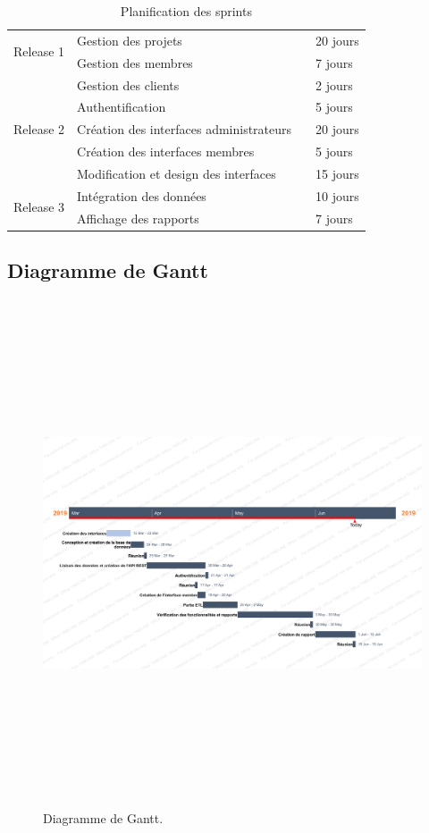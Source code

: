 \FloatBarrier
\begin{table}

\begin{tabular}{|l|l|l|}
\hline
\multirow{2}{*}{Release 1} & Gestion des projets                        & 20 jours  \\
\cline{2-3}
                           & Gestion des membres                        & 7 jours   \\
\hline
\multirow{5}{*}{Release 2} & Gestion des clients                        & 2 jours   \\
\cline{2-3}
                           & Authentification                           & 5 jours   \\
\cline{2-3}
                           & Création des interfaces administrateurs    & 20 jours  \\
\cline{2-3}
                           & Création des interfaces membres            & 5 jours   \\
\cline{2-3}
                           & Modification et design des interfaces~ ~ ~ & 15 jours  \\
\hline
\multirow{2}{*}{Release 3} & Intégration des données                    & 10 jours  \\
\cline{2-3}
                           & Affichage des rapports                     & 7 jours   \\
\hline

\end{tabular}
\centering
\caption{Planification des sprints }
\end{table}
\FloatBarrier


\subsection{Diagramme de Gantt}

\FloatBarrier
\begin{figure}[H]
\center
\includegraphics[width=15cm,height=15cm]{./figures/gantt.png}
\caption{Diagramme de Gantt.}
\end {figure}
\FloatBarrier